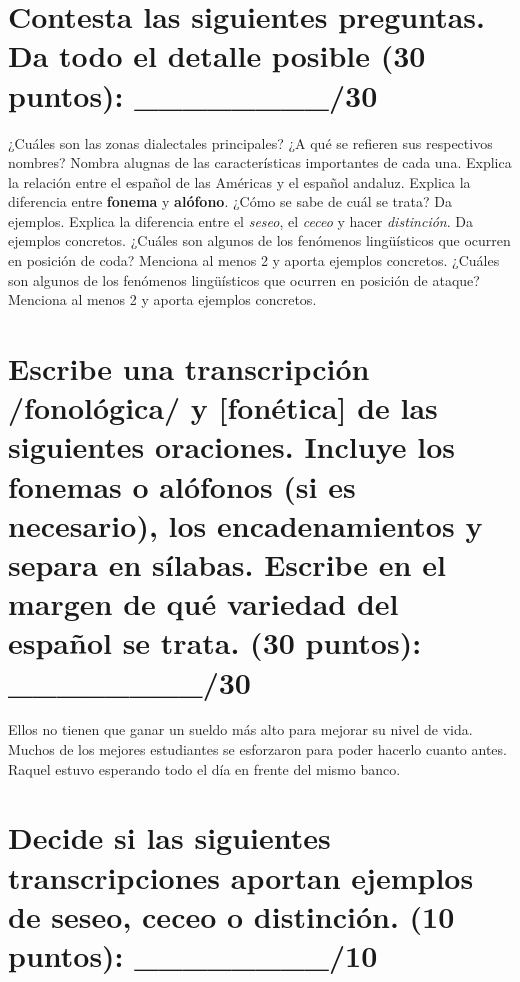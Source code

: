 \documentclass[12pt]{exam}
\begin{document}
\section{Contesta las siguientes preguntas. Da todo el detalle posible (30 puntos): \_\_\_\_\_\_\_\_/30}

\begin{questions}
	\question ¿Cuáles son las zonas dialectales principales? ¿A qué se refieren sus respectivos nombres? Nombra alugnas de las características importantes de cada una.
	\fillwithlines{2.35in}
	\question Explica la relación entre el español de las Américas y el español andaluz.
	\fillwithlines{2.35in}
	\question Explica la diferencia entre \textbf{fonema} y \textbf{alófono}. ¿Cómo se sabe de cuál se trata? Da ejemplos.
	\fillwithlines{2.35in}
	\question Explica la diferencia entre el \emph{seseo}, el \emph{ceceo} y hacer \emph{distinción}. Da ejemplos concretos.
	\fillwithlines{2.35in}
	\question ¿Cuáles son algunos de los fenómenos lingüísticos que ocurren en posición de coda? Menciona al menos 2 y aporta ejemplos concretos.
	\fillwithlines{2.35in}
	\question ¿Cuáles son algunos de los fenómenos lingüísticos que ocurren en posición de ataque? Menciona al menos 2 y aporta ejemplos concretos.
	\fillwithlines{2.35in}
\end{questions}

\section{Escribe una transcripción /fonológica/ y [fonética] de las siguientes oraciones. Incluye los fonemas o alófonos (si es necesario), los encadenamientos y separa en sílabas. Escribe en el margen de qué variedad del español se trata. (30 puntos): \_\_\_\_\_\_\_\_/30}

\begin{questions}
	\question Ellos no tienen que ganar un sueldo más alto para mejorar su nivel de vida.
	\fillwithlines{1in}
	\question Muchos de los mejores estudiantes se esforzaron para poder hacerlo cuanto antes.
	\fillwithlines{1in}
	\question Raquel estuvo esperando todo el día en frente del mismo banco.
	\fillwithlines{1in}
\end{questions}

\section{Decide si las siguientes transcripciones aportan ejemplos de seseo, ceceo o distinción. (10 puntos): \_\_\_\_\_\_\_\_/10}
\end{document}
